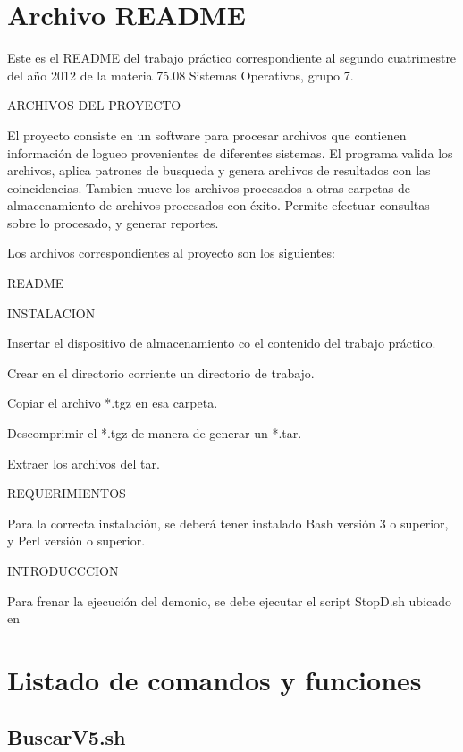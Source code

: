 \documentclass[a4paper,12pt]{article}
\begin{document}
\section{Archivo README}

Este es el README del trabajo práctico correspondiente al segundo cuatrimestre del año 2012 de la materia 75.08 Sistemas Operativos, grupo 7.

ARCHIVOS DEL PROYECTO

El proyecto consiste en un software para procesar archivos que contienen información de logueo provenientes de diferentes sistemas. El programa valida los archivos, aplica patrones de busqueda y genera archivos de resultados con las coincidencias. Tambien mueve los archivos procesados a otras carpetas de almacenamiento de archivos procesados con éxito. Permite efectuar consultas sobre lo procesado, y generar reportes.

Los archivos correspondientes al proyecto son los siguientes:

README

INSTALACION

Insertar el dispositivo de almacenamiento co el contenido del trabajo práctico.

Crear en el directorio corriente un directorio de trabajo.

Copiar el archivo *.tgz en esa carpeta.

Descomprimir el *.tgz de manera de generar un *.tar.

Extraer los archivos del tar.


REQUERIMIENTOS

Para la correcta instalación, se deberá tener instalado Bash versión 3 o superior, y Perl versión  o superior.


INTRODUCCCION



Para frenar la ejecución del demonio, se debe ejecutar el script StopD.sh ubicado en %

\section{Listado de comandos y funciones}

\subsection{ BuscarV5.sh }
\end{document}
